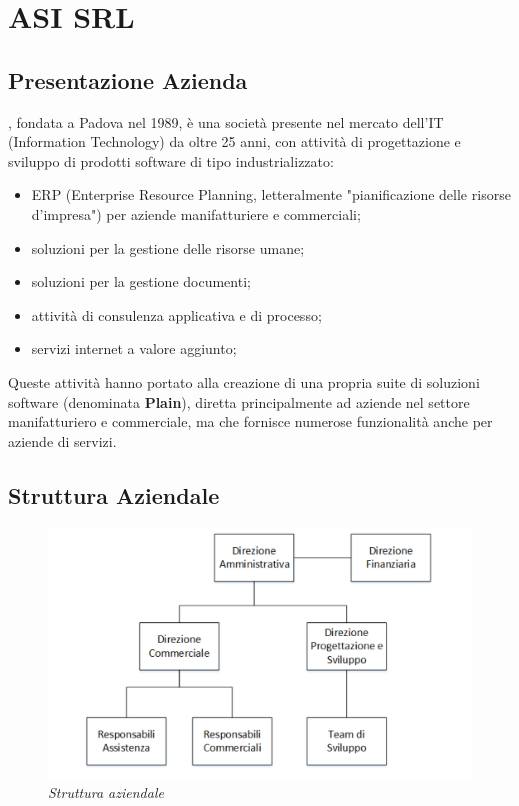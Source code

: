 
\newpage
\chapter{ASI SRL}
\label{cap:introduzione}
\section{Presentazione Azienda}
\asi, fondata a Padova nel 1989, è una società presente nel mercato dell'IT (Information Technology) da oltre 25 anni, con attività di progettazione e sviluppo di prodotti software di tipo industrializzato:
\begin{itemize}
	\item ERP (Enterprise Resource Planning, letteralmente "pianificazione delle risorse d'impresa") per aziende manifatturiere e commerciali;
	\item soluzioni per la gestione delle risorse umane;
	\item soluzioni per la gestione documenti;
	\item attività di consulenza applicativa e di processo;
	\item servizi internet a valore aggiunto;	
\end{itemize}
Queste attività hanno portato alla creazione di una propria suite di soluzioni software (denominata \textbf{Plain}), diretta principalmente ad aziende nel settore manifatturiero e commerciale, ma che fornisce numerose funzionalità anche per aziende di servizi.
\section{Struttura Aziendale}

\begin{figure}[ht]
	\centering
	\includegraphics[scale=0.20]{immagini/azienda/struttura_aziendale}
	\caption{\textit{Struttura aziendale \asi}}
\end{figure}\FloatBarrier

